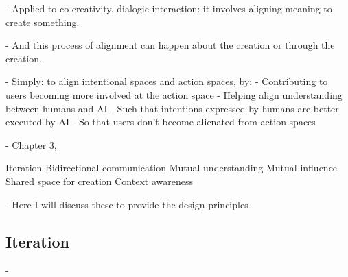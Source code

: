 - Applied to co-creativity, dialogic interaction: it involves aligning meaning to create something. 

- And this process of alignment can happen about the creation or through the creation. 

- Simply: to align intentional spaces and action spaces, by: 
- Contributing to users becoming more involved at the action space
- Helping align understanding between humans and AI
- Such that intentions expressed by humans are better executed by AI
- So that users don't become alienated from action spaces


- Chapter 3, 

Iteration
Bidirectional communication
Mutual understanding 
Mutual influence 
Shared space for creation 
Context awareness 

- Here I will discuss these to provide the design principles

\subsection{Iteration}

- 






